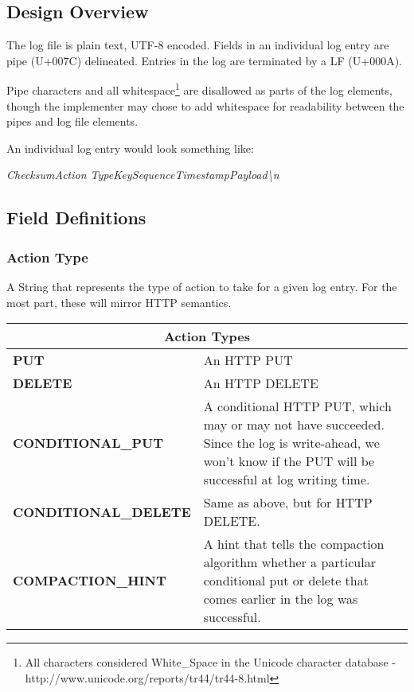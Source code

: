 \subsection{Design Overview}

The log file is plain text, UTF-8 encoded.  Fields in an individual log entry are pipe (U+007C) delineated.  Entries in the log are terminated by a LF (U+000A).

Pipe characters and all whitespace\footnote{All characters considered White\_Space in the Unicode character database - http://www.unicode.org/reports/tr44/tr44-8.html} are disallowed as parts of the log elements, though the implementer may chose to add whitespace for readability between the pipes and log file elements.  

An individual log entry would look something like:
\begin{center}
\em Checksum\textbar Action Type\textbar Key\textbar Sequence\textbar Timestamp\textbar Payload\textbackslash n
\end{center}


\subsection{Field Definitions}

\subsubsection{Action Type}
A String that represents the type of action to take for a given log entry.  For the most part, these will mirror HTTP semantics.

\begin{center}
\begin{tabular}{|l|p{3.5in}|}
\hline
\multicolumn{2}{|c|}{Action  Types}\\ \hline
\textbf{PUT} & An HTTP PUT\\ \hline
\textbf{DELETE} & An HTTP DELETE\\ \hline
\textbf{CONDITIONAL\_PUT} & A conditional HTTP PUT, which may or may not have succeeded.   Since the log is write-ahead, we won’t know if the PUT will be successful at log writing time.\\ \hline
\textbf{CONDITIONAL\_DELETE} & Same as above, but for HTTP DELETE.\\ \hline
\textbf{COMPACTION\_HINT} & A hint that tells the compaction algorithm whether a particular conditional put or delete that comes earlier in the log was successful.\\ \hline
\end{tabular}
\end{center}


